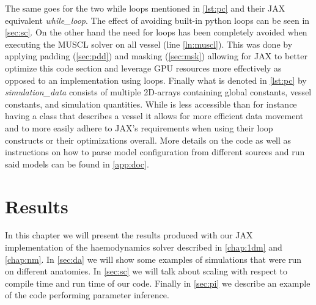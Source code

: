 \documentclass[a4paper, oneside]{discothesis}
\begin{document}
						The same goes for the two while loops mentioned in \autoref{lst:pc} and their JAX equivalent \emph{while\_loop}.
						The effect of avoiding built-in python loops can be seen in \autoref{sec:sc}.
						On the other hand the need for loops has been completely avoided when executing the MUSCL solver on all vessel (line \ref{ln:muscl}).
						This was done by applying padding (\autoref{sec:pdd}) and masking (\autoref{sec:msk}) allowing for JAX to better optimize this code section and leverage GPU resources more effectively as opposed to an implementation using loops.
						Finally what is denoted in \autoref{lst:pc} by \emph{simulation\_data} consists of multiple 2D-arrays containing global constants, vessel constants, and simulation quantities.
						While is less accessible than for instance having a class that describes a vessel it allows for more efficient data movement and to more easily adhere to JAX's requirements when using their loop constructs or their optimizations overall.
						More details on the code as well as instructions on how to parse model configuration from different sources and run said models can be found in \autoref{app:doc}.



						\chapter{Results} \label{chap:resl}
						In this chapter we will present the results produced with our JAX implementation of the haemodynamics solver described in \autoref{chap:1dm} and \autoref{chap:nm}. 
						In \autoref{sec:da} we will show some examples of simulations that were run on different anatomies.
						In \autoref{sec:sc} we will talk about scaling with respect to compile time and run time of our code.
						Finally in \autoref{sec:pi} we describe an example of the code performing parameter inference.
\end{document}
